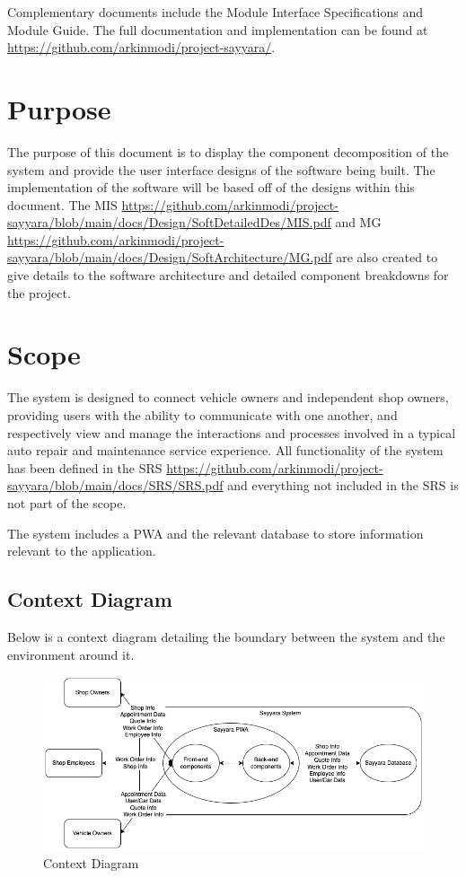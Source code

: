 \documentclass[12pt, titlepage]{article}
\begin{document}
Complementary documents include the Module Interface Specifications and Module Guide. The full
documentation and implementation can be found at
\url{https://github.com/arkinmodi/project-sayyara/}.

\section{Purpose}

The purpose of this document is to display the component decomposition of the system and provide
the user interface designs of the software being built. The implementation of the software will be
based off of the designs within this document. The MIS
\url{https://github.com/arkinmodi/project-sayyara/blob/main/docs/Design/SoftDetailedDes/MIS.pdf}
and MG
\url{https://github.com/arkinmodi/project-sayyara/blob/main/docs/Design/SoftArchitecture/MG.pdf}
are also created to give details to the software architecture and detailed component breakdowns for
the project.

\section{Scope}

The system is designed to connect vehicle owners and independent shop owners, providing users with
the ability to communicate with one another, and respectively view and manage the interactions and
processes involved in a typical auto repair and maintenance service experience. All functionality
of the system has been defined in the SRS
\url{https://github.com/arkinmodi/project-sayyara/blob/main/docs/SRS/SRS.pdf} and everything not
included in the SRS is not part of the scope.

The system includes a PWA and the relevant database to store information relevant to the
application.

\subsection{Context Diagram}

Below is a context diagram detailing the boundary between the system and the environment around it.

\begin{figure}[H]
	\centering
	\includegraphics[width=\textwidth]{./diagrams/ContextDiagram.png}
	\caption{Context Diagram}
	\label{ContextDiagram}
\end{figure}
\end{document}
